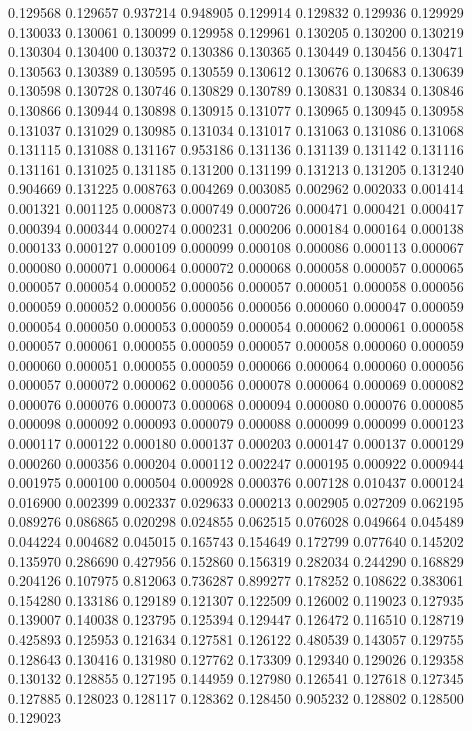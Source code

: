 0.129568
0.129657
0.937214
0.948905
0.129914
0.129832
0.129936
0.129929
0.130033
0.130061
0.130099
0.129958
0.129961
0.130205
0.130200
0.130219
0.130304
0.130400
0.130372
0.130386
0.130365
0.130449
0.130456
0.130471
0.130563
0.130389
0.130595
0.130559
0.130612
0.130676
0.130683
0.130639
0.130598
0.130728
0.130746
0.130829
0.130789
0.130831
0.130834
0.130846
0.130866
0.130944
0.130898
0.130915
0.131077
0.130965
0.130945
0.130958
0.131037
0.131029
0.130985
0.131034
0.131017
0.131063
0.131086
0.131068
0.131115
0.131088
0.131167
0.953186
0.131136
0.131139
0.131142
0.131116
0.131161
0.131025
0.131185
0.131200
0.131199
0.131213
0.131205
0.131240
0.904669
0.131225
0.008763
0.004269
0.003085
0.002962
0.002033
0.001414
0.001321
0.001125
0.000873
0.000749
0.000726
0.000471
0.000421
0.000417
0.000394
0.000344
0.000274
0.000231
0.000206
0.000184
0.000164
0.000138
0.000133
0.000127
0.000109
0.000099
0.000108
0.000086
0.000113
0.000067
0.000080
0.000071
0.000064
0.000072
0.000068
0.000058
0.000057
0.000065
0.000057
0.000054
0.000052
0.000056
0.000057
0.000051
0.000058
0.000056
0.000059
0.000052
0.000056
0.000056
0.000056
0.000060
0.000047
0.000059
0.000054
0.000050
0.000053
0.000059
0.000054
0.000062
0.000061
0.000058
0.000057
0.000061
0.000055
0.000059
0.000057
0.000058
0.000060
0.000059
0.000060
0.000051
0.000055
0.000059
0.000066
0.000064
0.000060
0.000056
0.000057
0.000072
0.000062
0.000056
0.000078
0.000064
0.000069
0.000082
0.000076
0.000076
0.000073
0.000068
0.000094
0.000080
0.000076
0.000085
0.000098
0.000092
0.000093
0.000079
0.000088
0.000099
0.000099
0.000123
0.000117
0.000122
0.000180
0.000137
0.000203
0.000147
0.000137
0.000129
0.000260
0.000356
0.000204
0.000112
0.002247
0.000195
0.000922
0.000944
0.001975
0.000100
0.000504
0.000928
0.000376
0.007128
0.010437
0.000124
0.016900
0.002399
0.002337
0.029633
0.000213
0.002905
0.027209
0.062195
0.089276
0.086865
0.020298
0.024855
0.062515
0.076028
0.049664
0.045489
0.044224
0.004682
0.045015
0.165743
0.154649
0.172799
0.077640
0.145202
0.135970
0.286690
0.427956
0.152860
0.156319
0.282034
0.244290
0.168829
0.204126
0.107975
0.812063
0.736287
0.899277
0.178252
0.108622
0.383061
0.154280
0.133186
0.129189
0.121307
0.122509
0.126002
0.119023
0.127935
0.139007
0.140038
0.123795
0.125394
0.129447
0.126472
0.116510
0.128719
0.425893
0.125953
0.121634
0.127581
0.126122
0.480539
0.143057
0.129755
0.128643
0.130416
0.131980
0.127762
0.173309
0.129340
0.129026
0.129358
0.130132
0.128855
0.127195
0.144959
0.127980
0.126541
0.127618
0.127345
0.127885
0.128023
0.128117
0.128362
0.128450
0.905232
0.128802
0.128500
0.129023
